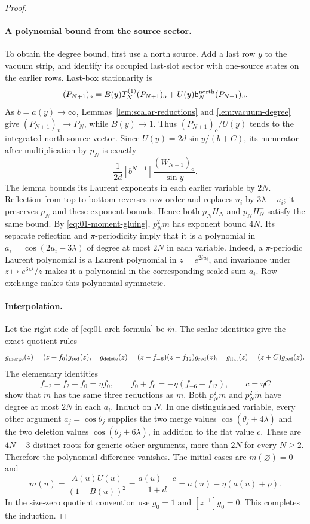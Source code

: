 \begin{proof}
\paragraph{A polynomial bound from the source sector.}
To obtain the degree bound, first use a north source. Add a last row
$y$ to the vacuum strip, and identify its occupied last-slot sector
with one-source states on the earlier rows. Last-box stationarity is
\begin{equation}\label{eq:01-north-source-limit}
 (P_{N+1})_o
 =B(y)T_N^{(1)}(P_{N+1})_o
   +U(y)\mathsf b_N^{\rm north}(P_{N+1})_v.
\end{equation}
As $b=a(y)\to\infty$, Lemmas~\ref{lem:scalar-reductions} and
\ref{lem:vacuum-degree} give $(P_{N+1})_v\to P_N$, while $B(y)\to1$.
Thus $(P_{N+1})_o/U(y)$ tends to the integrated north-source vector.
Since $U(y)=2d\sin y/(b+C)$, its numerator after multiplication by
$p_N$ is exactly
\[
 \frac1{2d}[b^{N-1}]\frac{(W_{N+1})_o}{\sin y}.
\]
The lemma bounds its Laurent exponents in each earlier variable by
$2N$. Reflection from top to bottom reverses row order and replaces
$u_i$ by $3\lambda-u_i$; it preserves $p_N$ and these exponent bounds.
Hence both $p_NH_N$ and $p_NH_N^-$ satisfy the same bound.
By \eqref{eq:01-moment-gluing}, $p_N^2m$ has exponent bound $4N$.
Its separate reflection and $\pi$-periodicity imply that it is a
polynomial in $a_i=\cos(2u_i-3\lambda)$ of degree at most $2N$ in
each variable. Indeed, a $\pi$-periodic Laurent polynomial is a
Laurent polynomial in $z=e^{2iu_i}$, and invariance under
$z\mapsto e^{6i\lambda}/z$ makes it a polynomial in the corresponding
scaled sum $a_i$. Row exchange makes this polynomial symmetric.

\paragraph{Interpolation.}
Let the right side of \eqref{eq:01-arch-formula} be $\widetilde m$.
The scalar identities give the exact quotient rules
\[
 g_{\rm merge}(z)=(z+f_0)g_{\rm red}(z),\quad
 g_{\rm delete}(z)=(z-f_{-6})(z-f_{12})g_{\rm red}(z),\quad
 g_{\rm flat}(z)=(z+C)g_{\rm red}(z).
\]
The elementary identities
\[
 f_{-2}+f_2-f_0=\eta f_0,\qquad
 f_0+f_6=-\eta(f_{-6}+f_{12}),\qquad c=\eta C
\]
show that $\widetilde m$ has the same three reductions as $m$.
Both $p_N^2m$ and $p_N^2\widetilde m$ have degree at most $2N$ in each
$a_i$. Induct on $N$. In one distinguished variable, every other
argument $a_j=\cos\theta_j$ supplies the two merge values
$\cos(\theta_j\pm4\lambda)$ and the two deletion values
$\cos(\theta_j\pm6\lambda)$, in addition to the flat value $c$.
These are $4N-3$ distinct roots for generic other arguments, more
than $2N$ for every $N\ge2$. Therefore the polynomial difference
vanishes. The initial cases are $m(\varnothing)=0$ and
\[
 m(u)=\frac{A(u)U(u)}{(1-B(u))^2}
     =\frac{a(u)-c}{1+d}
     =a(u)-\eta(a(u)+\rho).
\]
In the size-zero quotient convention use $g_0=1$ and
$[z^{-1}]g_0=0$. This completes the induction.
\end{proof}

